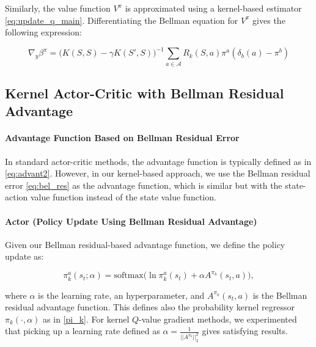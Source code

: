 \documentclass[
]{article}
\numberwithin{equation}{section}
\begin{document}
Similarly, the value function $V^\pi$ is approximated using a kernel-based estimator \eqref{eq:update_q_main}. Differentiating the Bellman equation for $V^\pi$ gives the following expression:

\begin{equation} \label{gradientBE2}
  \nabla_y \beta^\pi = \Big(K(S, S) - \gamma K(S', S) \Big)^{-1} \sum_{a \in \mathcal{A}} R_k(S,a)\pi^a(\delta_b(a)-\pi^b)
\end{equation} 

\hypertarget{Actor-Critic with Bellman Residual Advantage}{%
\subsection{Kernel Actor-Critic with Bellman Residual Advantage}\label{AC}}

\paragraph*{Advantage Function Based on Bellman Residual Error}

In standard actor-critic methods, the advantage function is typically defined as in \eqref{eq:advant2}. However, in our kernel-based approach, we use the Bellman residual error \eqref{eq:bel_res} as the advantage function, which is similar but with the state-action value function instead of the state value function. 

\paragraph*{Actor (Policy Update Using Bellman Residual Advantage)}

Given our Bellman residual-based advantage function, we define the policy update as:

\begin{equation} \label{UPDATEAC}
\pi_k^a(s_t; \alpha) = \text{softmax} \Big( \ln \pi_k^a(s_t) + \alpha A^{\pi_k}(s_t, a) \Big),
\end{equation}

where $\alpha$ is the learning rate, an hyperparameter, and $A^{\pi_k}(s_t, a)$ is the Bellman residual advantage function. This defines also the probability kernel regressor  $\pi_k(\cdot, \alpha)$ as in \eqref{pi_k}. For kernel $Q$-value gradient methods, we experimented that picking up a learning rate defined as $\alpha = \frac{1}{||A^{\pi_k}||_2^2}$ gives satisfying results. 
\end{document}
